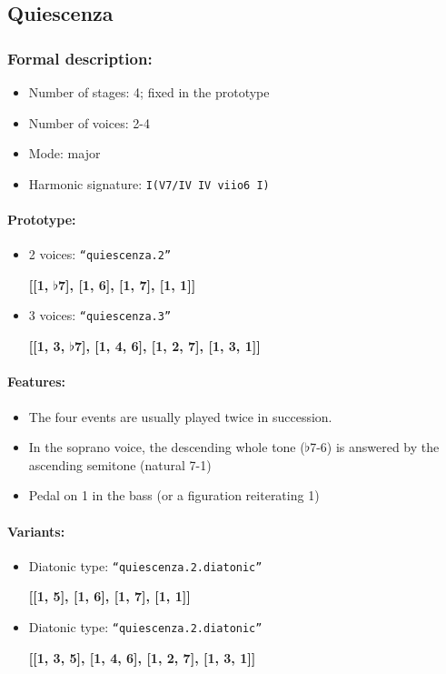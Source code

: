 \documentclass[11pt, openany]{article}
\begin{document}
	\subsection{Quiescenza}
	
\subsubsection{Formal description:}
\begin{itemize}
\item Number of stages: 4; fixed in the prototype
\item Number of voices: 2-4
\item Mode: major
\item Harmonic signature: \texttt{I(V7/IV IV viio6 I)}
\end{itemize}

\paragraph{Prototype:}
\begin{itemize}
\item 2 voices: \texttt{“quiescenza.2”}
	\begin{center}
	\textbf{[[1, $\flat$7], [1, 6], [1, 7], [1, 1]]}
	\end{center}
\item 3 voices: \texttt{“quiescenza.3”}
	\begin{center}
	\textbf{[[1, 3, $\flat$7], [1, 4, 6], [1, 2, 7], [1, 3, 1]]}
	\end{center}
\end{itemize}

\paragraph{Features:}
\begin{itemize}
\item The four events are usually played twice in succession.
\item In the soprano voice, the descending whole tone ($\flat$7-6) is answered by the ascending semitone (natural 7-1)
\item Pedal on 1 in the bass (or a figuration reiterating 1)
\end{itemize}

\paragraph{Variants:}
\begin{itemize}
\item Diatonic type: \texttt{“quiescenza.2.diatonic”}
	\begin{center}
	\textbf{[[1, 5], [1, 6], [1, 7], [1, 1]]}
	\end{center}
\item Diatonic type: \texttt{“quiescenza.2.diatonic”}
	\begin{center}
	\textbf{[[1, 3, 5], [1, 4, 6], [1, 2, 7], [1, 3, 1]]}
	\end{center}
\end{itemize}
\end{document}
